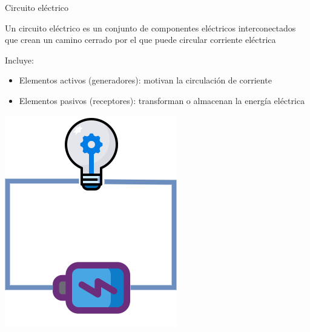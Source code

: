 \documentclass[aspectratio=169, xcolor={usenames,svgnames,dvipsnames}]{beamer}
\begin{document}
\begin{frame}{Circuito eléctrico}
    \begin{minipage}[c]{0.58\linewidth}
        Un \alert{circuito eléctrico} es un conjunto de componentes eléctricos interconectados que crean un camino cerrado por el que puede circular corriente eléctrica 
        \vspace{6mm}
        
        Incluye: 
        \begin{itemize}
        \item \alert{Elementos activos} (generadores): motivan la circulación de corriente
        \item \alert{Elementos pasivos} (receptores): transforman o almacenan la energía eléctrica
        \end{itemize}
    \end{minipage}
    \hfill%
    \begin{minipage}[c]{0.3\linewidth}
        \includegraphics[width=\linewidth]{../figs/circuito.png}
    \end{minipage}
\end{frame}
\end{document}
